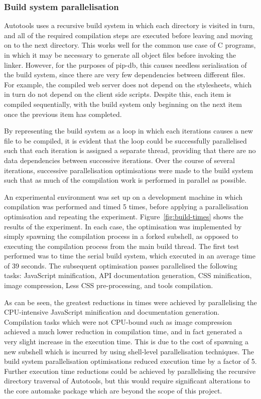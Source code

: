 \subsubsection*{Build system parallelisation}

Autotools uses a recursive build system in which each directory is
visited in turn, and all of the required compilation steps are
executed before leaving and moving on to the next directory. This
works well for the common use case of C programs, in which it may be
necessary to generate all object files before invoking the
linker. However, for the purposes of pip-db, this causes needless
serialisation of the build system, since there are very few
dependencies between different files. For example, the compiled web
server does not depend on the stylesheets, which in turn do not depend
on the client side scripts. Despite this, each item is compiled
sequentially, with the build system only beginning on the next item
once the previous item has completed.

By representing the build system as a loop in which each iterations
causes a new file to be compiled, it is evident that the loop could be
successfully parallelised such that each iteration is assigned a
separate thread, providing that there are no data dependencies between
successive iterations. Over the course of several iterations,
successive parallelisation optimisations were made to the build system
such that as much of the compilation work is performed in parallel as
possible.

An experimental environment was set up on a development machine in
which compilation was performed and timed 5 times, before applying a
parallelisation optimisation and repeating the
experiment. Figure~\ref{fig:build-times} shows the results of the
experiment. In each case, the optimisation was implemented by simply
spawning the compilation process in a forked subshell, as opposed to
executing the compilation process from the main build thread. The
first test performed was to time the serial build system, which
executed in an average time of 39 seconds. The subsequent optimisation
passes parallelised the following tasks: JavaScript minification, API
documentation generation, CSS minification, image compression, Less
CSS pre-processing, and tools compilation.

As can be seen, the greatest reductions in times were achieved by
parallelising the CPU-intensive JavaScript minification and
documentation generation. Compilation tasks which were not CPU-bound
such as image compression achieved a much lower reduction in
compilation time, and in fact generated a very slight increase in the
execution time. This is due to the cost of spawning a new subshell
which is incurred by using shell-level parallelisation techniques. The
build system parallelisation optimisations reduced execution time by a
factor of 5. Further execution time reductions could be achieved by
parallelising the recursive directory traversal of Autotools, but this
would require significant alterations to the core automake package
which are beyond the scope of this project.


